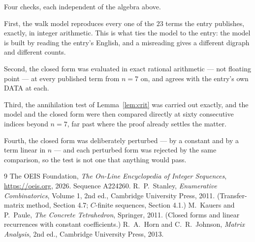 \documentclass[11pt,a4paper]{article}
\theoremstyle{plain}
\theoremstyle{definition}
\begin{document}
Four checks, each independent of the algebra above.

First, the walk model reproduces every one of the $23$ terms the entry publishes,
exactly, in integer arithmetic. This is what ties the model to the entry: the model is built
by reading the entry's English, and a misreading gives a different digraph and different
counts.

Second, the closed form was evaluated in exact rational arithmetic --- not floating point ---
at every published term from $n=7$ on, and agrees with the entry's own DATA at each.

Third, the annihilation test of Lemma~\ref{lem:crit} was carried out exactly, and the model
and the closed form were then compared directly at sixty consecutive indices beyond
$n=7$, far past where the proof already settles the matter.

Fourth, the closed form was deliberately perturbed --- by a constant and by a term linear in
$n$ --- and each perturbed form was rejected by the same comparison, so the test is not one
that anything would pass.

\begin{thebibliography}{9}
 The OEIS Foundation, \emph{The On-Line Encyclopedia of Integer
Sequences}, \url{https://oeis.org}, 2026. Sequence A224260.
 R.~P.~Stanley, \emph{Enumerative Combinatorics}, Volume 1, 2nd ed.,
Cambridge University Press, 2011. (Transfer-matrix method, Section 4.7; $C$-finite sequences,
Section 4.1.)
 M.~Kauers and P.~Paule, \emph{The Concrete Tetrahedron}, Springer, 2011.
(Closed forms and linear recurrences with constant coefficients.)
 R.~A.~Horn and C.~R.~Johnson, \emph{Matrix Analysis}, 2nd ed., Cambridge
University Press, 2013.
\end{thebibliography}
\end{document}
